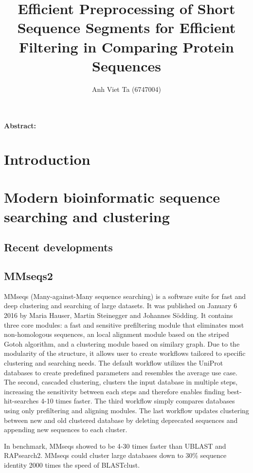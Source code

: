 \documentclass[11pt,a4paper]{scrartcl}
\title{Efficient Preprocessing of Short Sequence Segments for Efficient Filtering in Comparing Protein Sequences}
\author{Anh Viet Ta (6747004)}
\begin{document}
\begin{titlepage}
\maketitle
{}%
\thispagestyle{empty}

\textbf{Abstract:} 
\end{titlepage}
\setcounter{page}{1}

\section{Introduction}
\section{Modern bioinformatic sequence searching and clustering}
\subsection{Recent developments}

\subsection{MMseqs2}
MMseqs (Many-against-Many sequence searching) is a software suite for fast and deep clustering and searching of large datasets. It was published on January 6 2016 by Maria Hauser, Martin Steinegger and Johannes S\"odding. It contains three core modules: a fast and sensitive preﬁltering module that eliminates most non-homologous sequences, an local alignment module based on the striped Gotoh algorithm, and a clustering module based on similary graph. Due to the modularity of the structure, it allows user to create workflows tailored to specific clustering and searching needs. The default workflow utilizes the UniProt databases to create predefined parameters and resembles the average use case. The second, cascaded clustering, clusters the input database in multiple steps, increasing the sensitivity between each steps and therefore enables finding best-hit-searches 4-10 times faster. The third workflow simply compares databases using only prefiltering and aligning modules. The last workflow updates clustering between new and old clustered database by deleting deprecated sequences and appending new sequences to each cluster.

In benchmark, MMseqs showed to be 4-30 times faster than UBLAST and RAPsearch2. MMseqs could cluster large databases down to 30\% sequence identity 2000 times the speed of BLASTclust.
\end{document}
